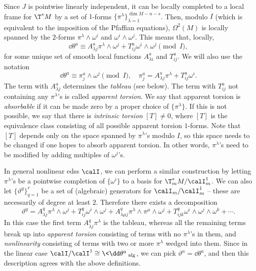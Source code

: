 Since $J$ is pointwise linearly independent, it can be locally completed to a local frame for $\T^\ast M$ by a set of $1$-forms $\{\pi^\lambda\}_{\lambda=1}^{\dim M-n-s}$. Then, modulo $I$ (which is equivalent to the imposition of the Pfaffian equations), $\Omega^2(M)$ is locally spanned by the $2$-forms $\pi^\lambda\wedge \omega^i$ and $\omega^i\wedge\omega^j$. This means that, locally,
\[\dd\theta^a\equiv A^a_{\lambda j}\pi^\lambda\wedge\omega^j+T^a_{ij}\omega^i\wedge\omega^j \pmod{I},\label{eq def tableau+torsion}\]
for some unique set of smooth local functions $A^a_{\lambda i}$ and $T^a_{ij}$. We will also use the notation 
\[\dd\theta^a\equiv \pi^a_j\wedge\omega^j\pmod{I},\quad \pi^a_j=A^a_{\lambda j}\pi^\lambda+T^a_{ij}\omega^i.\]
The term with $A^a_{\lambda j}$ determines the \emph{tableau} (see below). The term with $T^a_{ij}$ not containing any $\pi^\lambda$'s is called \emph{apparent torsion}. We say that apparent torsion is \emph{absorbable} if it can be made zero by a proper choice of $\{\pi^\lambda\}$. If this is not possible, we say that there is \emph{intrinsic torsion} $[T]\neq 0$, where $[T]$ is the equivalence class consisting of all possible apparent torsion $1$-forms. Note that $[T]$ depends only on the space spanned by $\pi^\lambda$'s modulo $I$, so this space needs to be changed if one hopes to absorb apparent torsion. In other words, $\pi^\lambda$'s need to be modified by adding multiples of $\omega^j$'s.

\begin{rem}
    In general nonlinear \glspl{eds} $\calI$, we can perform a similar construction by letting $\pi^\lambda$'s be a pointwise completion of $\{\omega^i\}$ to a basis for $\T_m^\ast M\slash \calI^1_m$. We can also let  $\{\vartheta^q\}_{q=1}^r$  be a set of (algebraic) generators for $\calI_m\slash \calI^1_m$ -- these are necessarily of degree at least $2$. Therefore there exists a decomposition 
    \[\vartheta^q=A^q_{\lambda j}\pi^\lambda\wedge\omega^j+T^q_{ij}\omega^i\wedge\omega^j + A^q_{\lambda\mu j}\pi^\lambda\wedge\pi^\mu\wedge \omega^j + T^q_{ijk}\omega^i\wedge\omega^j\wedge\omega^k+\cdots. \]
    In this case the first term $A^q_{\lambda j}\pi^\lambda$ is the tableau, whereas all the remaining terms break up into \emph{apparent torsion} consisting of terms with no $\pi^\lambda$'s in them, and \emph{nonlinearity} consisting of terms with two or more $\pi^\lambda$ wedged into them. Since in the linear case $\calI\slash \calI^1\cong \<\dd\theta^a\>_{\mathrm{alg}}$, we can pick $\vartheta^a=\dd\theta^a$, and then this description agrees with the above definitions.
\end{rem}


